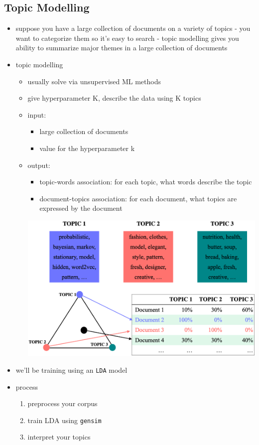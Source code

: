 \documentclass[10.5pt,a4paper, fleqn, dvipsnames]{article}
\begin{document}
\subsection*{Topic Modelling}
\begin{itemize}
    \item suppose you have a large collection of documents on a variety of topics - you want to categorize them so it's easy to search - topic modelling gives you ability to summarize major themes in a large collection of documents
    \item topic modelling
    \begin{itemize}
        \item usually solve via unsupervised ML methods
        \item give hyperparameter K, describe the data using K topics
        \item input: 
        \begin{itemize}[leftmargin = 2em]
            \item large collection of documents 
            \item value for the hyperparameter k
        \end{itemize}
        \item output: 
        \begin{itemize}[leftmargin = 2em]
            \item topic-words association: for each topic, what words describe the topic 
            \item document-topics association: for each document, what topics are expressed by the document
        \end{itemize}
        \includegraphics[scale = 0.3]{topic-modelling.png}
    \end{itemize}
    \item we'll be training using an \lstinline{LDA} model
    \item process
    \begin{enumerate}
        \item preprocess your corpus
        \item train LDA using \lstinline{gensim}
        \item interpret your topics 
    \end{enumerate}
\end{itemize}
\end{document}
